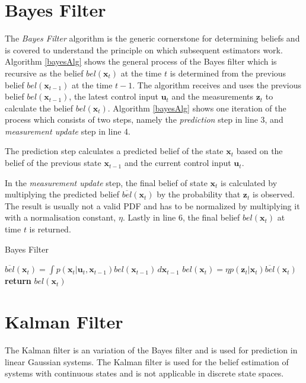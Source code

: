 \documentclass[12pt,oneside,openany,a4paper, %
afrikaans,english,
]{memoir}
\numberwithin{equation}{chapter}
\begin{document}
\section{Bayes Filter}\label{sec:bayesFilter}
The \textit{Bayes Filter} algorithm is the generic cornerstone for determining beliefs and is covered to understand the principle on which subsequent estimators work. Algorithm \ref{bayesAlg} shows the general process of the Bayes filter which is recursive as the belief $bel(\bm{x}_{t})$ at the time $t$ is determined from the previous belief $bel(\bm{x}_{t-1})$ at the time $t-1$. The algorithm receives and uses the previous belief $bel(\bm{x}_{t-1})$, the latest control input $\bm{u}_t$ and the measurements $\bm{z}_t$ to calculate the belief $bel(\bm{x}_t)$. Algorithm \ref{bayesAlg} shows one iteration of the process which consists of two steps, namely the \textit{prediction} step in line 3, and \textit{measurement update} step in line 4.

The prediction step calculates a predicted belief of the state $\bm{x}_t$ based on the belief of the previous state $\bm{x}_{t-1}$ and the current control input $\bm{u}_t$.

In the \textit{measurement update} step, the final belief of state $\bm{x}_t$ is calculated by multiplying the predicted belief $\overline{bel}(\bm{x}_t)$ by the probability that $\bm{z}_t$ is observed. The result is usually not a valid PDF and has to be normalized by multiplying it with a normalisation constant, $\eta$. Lastly in line 6, the final belief $bel(\bm{x}_t)$ at time $t$ is returned.
\begin{algorithm}
\caption{Bayes Filter}\label{bayesAlg}
\begin{algorithmic}[1]
\State $\overline{bel}(\bm{x}_t) = \int p(\bm{x}_t|\bm{u}_t, \bm{x}_{t-1})bel(\bm{x}_{t-1})\, d\bm{x}_{t-1}$
\State $bel(\bm{x}_t) = \eta p(\bm{z}_t|\bm{x}_t) \overline{bel} (\bm{x}_t)$
\EndFor
\State \textbf{return} $bel(\bm{x}_t)$
\EndProcedure
\end{algorithmic}
\end{algorithm}

\section{Kalman Filter}
The Kalman filter is an variation of the Bayes filter and is used for prediction in linear Gaussian systems. The Kalman filter is used for the belief estimation of systems with continuous states and is not applicable in discrete state spaces. 
\end{document}
